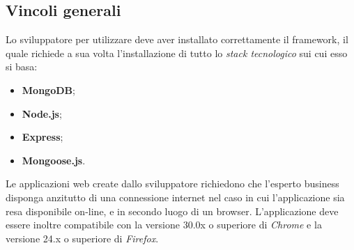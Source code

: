 	\subsection{Vincoli generali}
	Lo sviluppatore per utilizzare \ProjectName{} deve aver installato correttamente il framework, il quale richiede a sua volta l'installazione di tutto lo \textit{stack tecnologico} sui cui esso si basa:
	\begin{itemize}
		\item \textbf{MongoDB};
		\item \textbf{Node.js};
		\item \textbf{Express};
		\item \textbf{Mongoose.js}.
	\end{itemize}
	Le applicazioni web create dallo sviluppatore richiedono che l'esperto business disponga anzitutto di una connessione internet nel caso in cui l'applicazione sia resa disponibile on-line, e in secondo luogo di un browser. L'applicazione deve essere inoltre compatibile con la versione 30.0x o superiore di \textit{Chrome} e la versione 24.x o superiore di \textit{Firefox}.